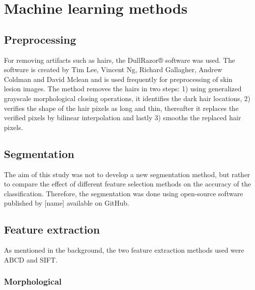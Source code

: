\documentclass{kththesis}
\begin{document}
\section{Machine learning methods}

\subsection{Preprocessing}

For removing artifacts such as hairs, the DullRazor® software was used. The software is created by Tim Lee, Vincent Ng, Richard Gallagher, Andrew Coldman and David Mclean and is used frequently for preprocessing of skin lesion images. The method removes the hairs in two steps: 1) using generalized grayscale morphological closing operations, it identifies the dark hair locations, 2) verifies the shape of the hair pixels as long and thin, thereafter it replaces the verified pixels by bilinear interpolation and lastly 3) smooths the replaced hair pixels. \parencite{dermwebDullRazor} %


\subsection{Segmentation}


The aim of this study was not to develop a new segmentation method, but rather to compare the effect of different feature selection methods on the accuracy of the classification. Therefore, the segmentation was done using open-source software published by [name] available on GitHub.

\subsection{Feature extraction}

As mentioned in the background, the two feature extraction methods used were ABCD and SIFT.

\subsubsection{Morphological} %

\end{document}
